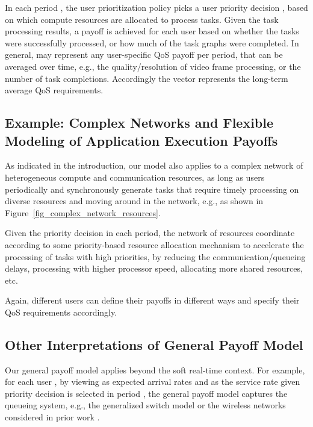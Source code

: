 \documentclass[prodmode,acmtompecs]{acmsmall}
\newcommand{\myComments}[1]{}
\newif\ifdissertation
\newcommand{\dissertationStart}{\ifdissertation  \myComments{Dissertation version: }}
\newcommand{\commentEnd}{\myComments{End}}
\begin{document}
In each period , the user prioritization policy picks a user priority decision , based on which compute resources are allocated to process tasks. 
Given the task processing results, a payoff  is achieved for each user  based on whether the tasks were successfully processed, or how much of the task graphs were completed. 
In general,  may represent any user-specific QoS payoff per period, that can be averaged over time, e.g., the quality/resolution of video frame processing, or the number of task completions. Accordingly the vector  represents the long-term average QoS requirements. 

\dissertationStart
Note that these payoff vectors depend heavily on the internal design of the system and in this paper we assume the internal design is fixed and has been carefully optimized by the computing system architect. 
In practice, it may be challenging to jointly optimize the internal design and the stationary priority scheduling policy to provide the best QoS to users. 
A discussion of different internal designs in a specific computing system model is provided in [?]. 
\commentEnd\fi

\subsection{Example: Complex Networks and Flexible Modeling of Application Execution Payoffs}
As indicated in the introduction, our model also applies to a complex network of heterogeneous compute and communication resources, as long as users periodically and synchronously generate tasks that require timely processing on diverse resources and moving around in the network, e.g., as shown in Figure~\ref{fig_complex_network_resources}. 

Given the priority decision in each period, the network of resources coordinate according to some priority-based resource allocation mechanism to accelerate the processing of tasks with high priorities, by reducing the communication/queueing delays, processing with higher processor speed, allocating more shared resources, etc. 

Again, different users can define their payoffs in different ways and specify their QoS requirements accordingly. 

\dissertationStart
\myComments{In dissertaion, we have to re-organize this section. }
\subsection{Other Interpretations of General Payoff Model}
Our general payoff model applies beyond the soft real-time context. For example, for each user , by viewing  as expected arrival rates and  as the service rate given priority decision  is selected in period , the general payoff model captures the queueing system, e.g., the generalized switch model or the wireless networks considered in prior work \cite{DiW06,JLS07,KWJ13}. 
\end{document}
